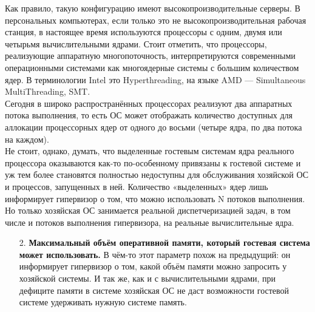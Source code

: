 \documentclass[14pt, a4paper]{article}
\begin{document}
\noindent Как правило, такую конфигурацию имеют высокопроизводительные серверы. В персональных
компьютерах, если только это не высокопроизводительная рабочая станция, в настоящее время
используются процессоры с одним, двумя или четырьмя вычислительными ядрами. Стоит отметить,
что процессоры, реализующие аппаратную многопоточность, интерпретируются современными
операционными системами как многоядерные системы с большим количеством ядер. В терминологии
Intel это Hyperthreading, на языке AMD — Simultaneous MultiThreading, SMT.\\

Сегодня в широко распространённых процессорах реализуют два аппаратных потока выполнения, то
есть ОС может отображать количество доступных для аллокации процессорных ядер от одного до
восьми (четыре ядра, по два потока на каждом).\\

Не стоит, однако, думать, что выделенные гостевым системам ядра реального процессора
оказываются как-то по-особенному привязаны к гостевой системе и уж тем более становятся
полностью недоступны для обслуживания хозяйской ОС и процессов, запущенных в ней. Количество
«выделенных» ядер лишь информирует гипервизор о том, что можно использовать N потоков
выполнения. Но только хозяйская ОС занимается реальной диспетчеризацией задач, в том числе и
потоков выполнения гипервизора, на реальные вычислительные ядра.
\begin{enumerate}

\item[2.] \textbf{Максимальный объём оперативной памяти, который гостевая система может
использовать.} В чём-то этот параметр похож на предыдущий: он информирует гипервизор о
том, какой объём памяти можно запросить у хозяйской системы. И так же, как и с
вычислительными ядрами, при дефиците памяти в системе хозяйская ОС не даст
возможности гостевой системе удерживать нужную системе память.
\end{enumerate}
\end{document}
